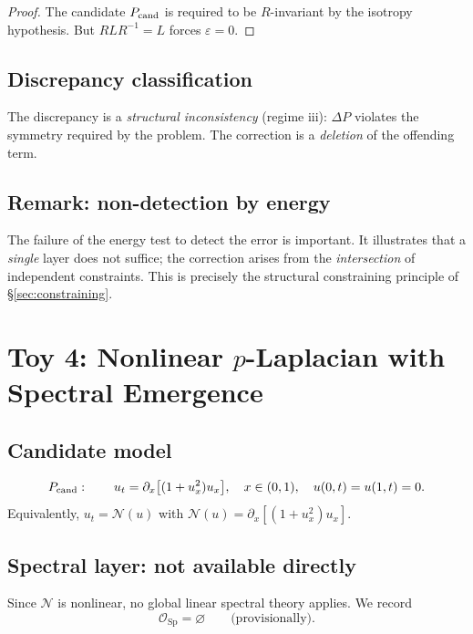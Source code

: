 \documentclass[11pt,a4paper]{article}
\theoremstyle{definition}
\theoremstyle{plain}
\newcommand{\Sp}{\mathrm{Sp}}
\newcommand{\Ocal}{\mathcal{O}}
\newcommand{\Ncal}{\mathcal{N}}
\begin{document}
\begin{proof}
The candidate $P_{\rm cand}$ is required to be $R$-invariant by the
isotropy hypothesis. But $R L R^{-1} = L$ forces $\varepsilon = 0$.
\end{proof}

\subsection{Discrepancy classification}

The discrepancy is a \emph{structural inconsistency} (regime iii):
$\Delta P$ violates the symmetry required by the problem. The
correction is a \emph{deletion} of the offending term.

\subsection{Remark: non-detection by energy}

The failure of the energy test to detect the error is important. It
illustrates that a \emph{single} layer does not suffice; the
correction arises from the \emph{intersection} of independent
constraints. This is precisely the structural constraining principle
of \S\ref{sec:constraining}.

\section{Toy 4: Nonlinear $p$-Laplacian with Spectral Emergence}
\label{sec:toy4}

\subsection{Candidate model}

\[
  P_{\rm cand}: \qquad
  u_t = \partial_x \bigl[ (1 + u_x^2) u_x \bigr],
  \quad x \in (0,1), \quad u(0,t) = u(1,t) = 0.
\]
Equivalently, $u_t = \Ncal(u)$ with
$\Ncal(u) = \partial_x[(1 + u_x^2) u_x]$.

\subsection{Spectral layer: not available directly}

Since $\Ncal$ is nonlinear, no global linear spectral theory applies.
We record
\[
  \Ocal_\Sp = \varnothing
  \qquad \text{(provisionally)}.
\]
\end{document}
